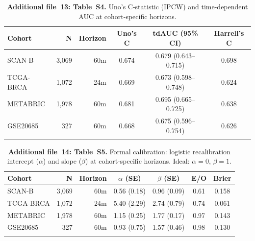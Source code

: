 \documentclass[referee,lineno,pdflatex,sn-vancouver-num]{sn-jnl}
\begin{document}
\begin{table}[h]
\caption{\textbf{Additional file~13: Table~S4.} Uno's C-statistic (IPCW) and time-dependent AUC at cohort-specific horizons.}\label{tab:s4-unoc}
\begin{tabular}{@{}lrrccc@{}}
\toprule
Cohort & N & Horizon & Uno's C & tdAUC (95\% CI) & Harrell's C \\
\midrule
SCAN-B & 3,069 & 60m & 0.674 & 0.679 (0.643--0.715) & 0.698 \\
TCGA-BRCA & 1,072 & 24m & 0.669 & 0.673 (0.598--0.748) & 0.624 \\
METABRIC & 1,978 & 60m & 0.681 & 0.695 (0.665--0.725) & 0.638 \\
GSE20685 & 327 & 60m & 0.668 & 0.675 (0.596--0.754) & 0.626 \\
\botrule
\end{tabular}
\end{table}

\begin{table}[h]
\caption{\textbf{Additional file~14: Table~S5.} Formal calibration: logistic recalibration intercept ($\alpha$) and slope ($\beta$) at cohort-specific horizons. Ideal: $\alpha = 0$, $\beta = 1$.}\label{tab:s5-calibration}
\begin{tabular}{@{}lrrcccc@{}}
\toprule
Cohort & N & Horizon & $\alpha$ (SE) & $\beta$ (SE) & E/O & Brier \\
\midrule
SCAN-B & 3,069 & 60m & 0.56 (0.18) & 0.96 (0.09) & 0.61 & 0.158 \\
TCGA-BRCA & 1,072 & 24m & 5.40 (2.29) & 2.74 (0.79) & 0.74 & 0.061 \\
METABRIC & 1,978 & 60m & 1.15 (0.25) & 1.77 (0.17) & 0.97 & 0.143 \\
GSE20685 & 327 & 60m & 0.93 (0.75) & 1.57 (0.46) & 0.98 & 0.130 \\
\botrule
\end{tabular}
\end{table}
\end{document}
